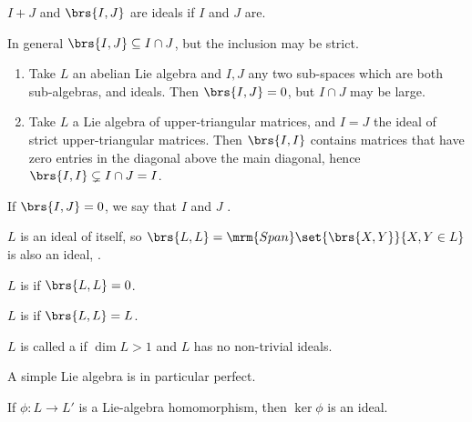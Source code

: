 \documentclass[10pt,a4paper,twoside,openany,hidelinks]{book}
\begin{document}
\begin{conclusion}
$I+J$ and $\brs{I,J}$ are ideals if $I$ and $J$ are.
\end{conclusion}
\begin{remark}
In general $\brs{I,J} \subseteq I \cap J$, but the inclusion may be strict.\\
\begin{examples}
\begin{enumerate}
\item Take $L$ an abelian Lie algebra and $I,J$ any two sub-spaces which are both sub-algebras, and ideals. Then $\brs{I,J} = 0$, but $I \cap J$ may be large.
\item Take $L$ a Lie algebra of upper-triangular matrices, and $I=J$ the ideal of strict upper-triangular matrices. Then $\brs{I,I}$ contains matrices that have zero entries in the diagonal above the main diagonal, hence $\brs{I,I} \subsetneq I\cap J = I$.
\end{enumerate}
\end{examples}
\end{remark}
\begin{definition}
If $\brs{I,J} = 0$, we say that $I$ and $J$ .
\end{definition}
\begin{remark}
$L$ is an ideal of itself, so $\brs{L,L} = \mrm{Span}\set{\brs{X,Y}}{X,Y \in L}$ is also an ideal, .
\end{remark}
\begin{definition}
$L$ is  if $\brs{L,L} = 0$.
\end{definition}
\begin{definition}
$L$ is  if $\brs{L,L} = L$.
\end{definition}
\begin{definition}
$L$ is called a  if $\dim L > 1$ and $L$ has no non-trivial ideals.
\end{definition}
\begin{exercise}
A simple Lie algebra is in particular perfect.
\end{exercise}
\begin{proposition}
If $\phi \colon L \to L'$ is a Lie-algebra homomorphism, then $\ker \phi$ is an ideal.
\end{proposition}
\end{document}
